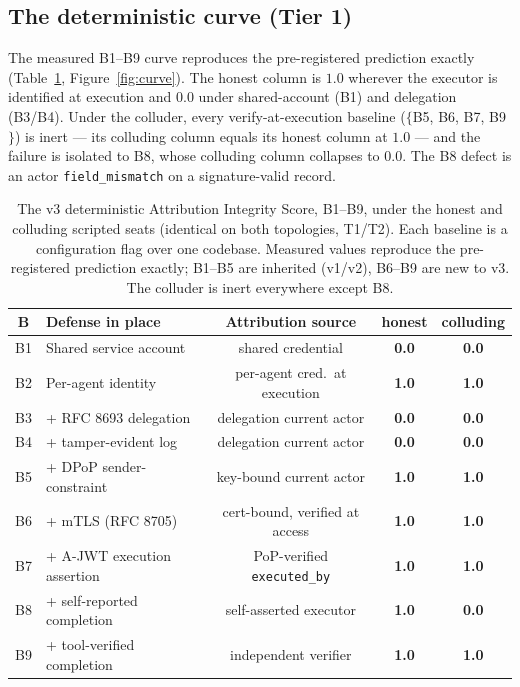 \documentclass[11pt]{article}
\newcommand{\code}[1]{\texttt{#1}}
\begin{document}
\subsection{The deterministic curve (Tier 1)}
The measured B1--B9 curve reproduces the pre-registered prediction exactly
(Table~\ref{tab:curve}, Figure~\ref{fig:curve}). The honest column is $1.0$
wherever the executor is identified at execution and $0.0$ under shared-account
(B1) and delegation (B3/B4). Under the colluder, every verify-at-execution
baseline ($\{$B5, B6, B7, B9$\}$) is inert --- its colluding column equals its
honest column at $1.0$ --- and the failure is isolated to B8, whose colluding
column collapses to $0.0$. The B8 defect is an actor \code{field\_mismatch} on a
signature-valid record.

\begin{table}[htbp]
\centering
\caption{The v3 deterministic Attribution Integrity Score, B1--B9, under the
honest and colluding scripted seats (identical on both topologies, T1/T2). Each
baseline is a
configuration flag over one codebase. Measured values reproduce the
pre-registered prediction exactly; B1--B5 are inherited (v1/v2), B6--B9 are new
to v3. The colluder is inert everywhere except B8.}
\label{tab:curve}
\begin{tabular}{clccc}
\toprule
\textbf{B} & \textbf{Defense in place} & \textbf{Attribution source} &
\textbf{honest} & \textbf{colluding} \\
\midrule
B1 & Shared service account        & shared credential              & \textbf{0.0} & \textbf{0.0} \\
B2 & Per-agent identity            & per-agent cred.\ at execution  & \textbf{1.0} & \textbf{1.0} \\
B3 & + RFC 8693 delegation         & delegation current actor       & \textbf{0.0} & \textbf{0.0} \\
B4 & + tamper-evident log          & delegation current actor       & \textbf{0.0} & \textbf{0.0} \\
B5 & + DPoP sender-constraint      & key-bound current actor        & \textbf{1.0} & \textbf{1.0} \\
B6 & + mTLS (RFC 8705)             & cert-bound, verified at access & \textbf{1.0} & \textbf{1.0} \\
B7 & + A-JWT execution assertion   & PoP-verified \code{executed\_by} & \textbf{1.0} & \textbf{1.0} \\
B8 & + self-reported completion    & self-asserted executor         & \textbf{1.0} & \textbf{0.0} \\
B9 & + tool-verified completion    & independent verifier           & \textbf{1.0} & \textbf{1.0} \\
\bottomrule
\end{tabular}
\end{table}
\end{document}
